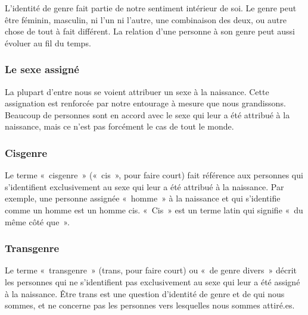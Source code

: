 \documentclass[12pt,openany]{book}
\begin{document}
L’identité de genre fait partie de notre sentiment intérieur de soi. Le genre peut être féminin, masculin, ni l’un ni l’autre, une combinaison des deux, ou autre chose de tout à fait différent. La relation d’une personne à son genre peut aussi évoluer au fil du temps.

\subsubsection*{Le sexe assigné}

\noindent La plupart d’entre nous se voient attribuer un sexe à la naissance. Cette assignation est renforcée par notre entourage à mesure que nous grandissons. Beaucoup de personnes sont en accord avec le sexe qui leur a été attribué à la naissance, mais ce n’est pas forcément le cas de tout le monde.

\subsubsection*{Cisgenre}

\noindent Le terme \mbox{« cisgenre »} (\mbox{« cis »}, pour faire court) fait référence aux personnes qui s’identifient exclusivement au sexe qui leur a été attribué à la naissance. Par exemple, une personne assignée \mbox{« homme »} à la naissance et qui s’identifie comme un homme est un homme cis.
\mbox{« Cis »} est un terme latin qui signifie \mbox{« d}u même côté qu\mbox{e »}.

\begin{figure}[h]
    \centering
\end{figure}

\subsubsection*{Transgenre} 

\noindent Le terme \mbox{« transgenre »} (trans, pour faire court) ou \mbox{« d}e genre diver\mbox{s »} décrit les personnes qui ne s’identifient pas exclusivement au sexe qui leur a été assigné à la naissance. Être trans est une question d’identité de genre et de qui nous sommes, et ne concerne pas les personnes vers lesquelles nous sommes attiré.es.
\end{document}
